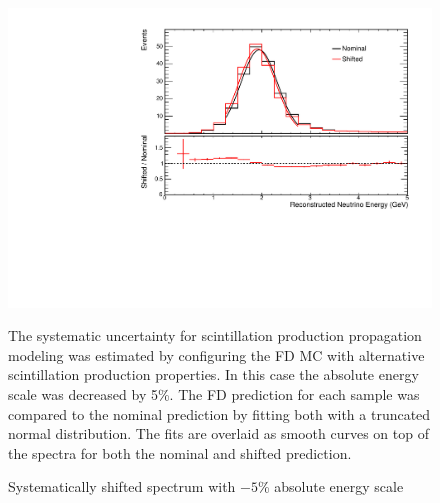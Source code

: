 {\begin{figure}
\begin{center}
\includegraphics[width=\textwidth]{figures/systs/params/fd_flat095cal.pdf}
\end{center}
\caption{Systematically shifted spectrum with $-5$\% absolute energy scale}{
The systematic uncertainty for scintillation production propagation modeling
was estimated by configuring the FD MC with alternative
scintillation production properties.
In this case the absolute energy scale was decreased by 5\%.
The FD prediction for each sample was compared to the nominal prediction
by fitting both with a truncated normal distribution.
The fits are overlaid as smooth curves on top of the spectra for both
the nominal and shifted prediction.
}
\label{syst_param_flat095cal}
\end{figure}


}

